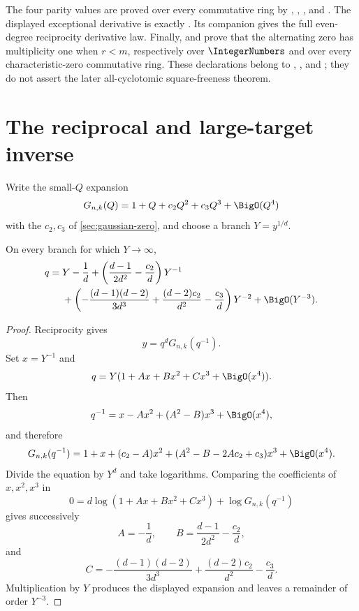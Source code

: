 \begin{remark}
The four parity values are proved over every commutative ring by
,
,
, and
.  The displayed exceptional
derivative is exactly
.  Its companion
 gives the full
even-degree reciprocity derivative law.  Finally,
 and
 prove that the alternating
zero has multiplicity one when \(r<m\), respectively over \(\IntegerNumbers\)
and over every characteristic-zero commutative ring.  These declarations
belong to ,
, and
; they do not assert the later
all-cyclotomic square-freeness theorem.
\end{remark}

\section{The reciprocal and large-target inverse}
\label{sec:gaussian-infinity}
\label{sec:gaussian-reciprocity}

Write the small-\(Q\) expansion
\[
  G_{n,k}(Q)=1+Q+c_2Q^2+c_3Q^3+\BigO(Q^4)
\]
with the \(c_2,c_3\) of \cref{sec:gaussian-zero}, and choose a branch
\(Y=y^{1/d}\).

\begin{theorem}
\label{thm:gq-large-inverse}
On every branch for which \(Y\to\infty\),
\begin{align*}
  q={}&Y-\frac1d
  +\left(\frac{d-1}{2d^2}-\frac{c_2}{d}\right)Y^{-1}\\
  &+\left(
    -\frac{(d-1)(d-2)}{3d^3}
    +\frac{(d-2)c_2}{d^2}
    -\frac{c_3}{d}
  \right)Y^{-2}
  +\BigO(Y^{-3}).
\end{align*}
\end{theorem}

\begin{proof}
Reciprocity gives
\[
  y=q^dG_{n,k}(q^{-1}).
\]
Set \(x=Y^{-1}\) and
\[
  q=Y(1+Ax+Bx^2+Cx^3+\BigO(x^4)).
\]
Then
\[
  q^{-1}
  =x-Ax^2+(A^2-B)x^3+\BigO(x^4),
\]
and therefore
\[
  G_{n,k}(q^{-1})
  =1+x+(c_2-A)x^2+
   (A^2-B-2Ac_2+c_3)x^3+\BigO(x^4).
\]
Divide the equation by \(Y^d\) and take logarithms.  Comparing the
coefficients of \(x,x^2,x^3\) in
\[
  0=d\log(1+Ax+Bx^2+Cx^3)
    +\log G_{n,k}(q^{-1})
\]
gives successively
\[
  A=-\frac1d,\qquad
  B=\frac{d-1}{2d^2}-\frac{c_2}{d},
\]
and
\[
  C=-\frac{(d-1)(d-2)}{3d^3}
    +\frac{(d-2)c_2}{d^2}
    -\frac{c_3}{d}.
\]
Multiplication by \(Y\) produces the displayed expansion and leaves a
remainder of order \(Y^{-3}\).
\end{proof}


